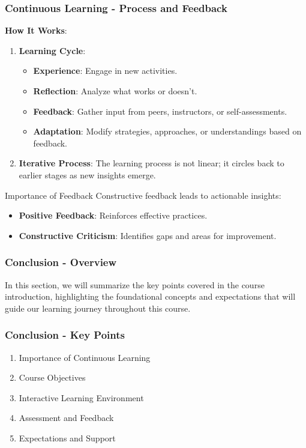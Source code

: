 \documentclass[aspectratio=169]{beamer}
\begin{document}
\begin{frame}[fragile]
    \frametitle{Continuous Learning - Process and Feedback}
    \textbf{How It Works}:
    \begin{enumerate}
        \item \textbf{Learning Cycle}:
            \begin{itemize}
                \item \textbf{Experience}: Engage in new activities.
                \item \textbf{Reflection}: Analyze what works or doesn't.
                \item \textbf{Feedback}: Gather input from peers, instructors, or self-assessments.
                \item \textbf{Adaptation}: Modify strategies, approaches, or understandings based on feedback.
            \end{itemize}
    
        \item \textbf{Iterative Process}: 
            The learning process is not linear; it circles back to earlier stages as new insights emerge.
    \end{enumerate}

    \begin{block}{Importance of Feedback}
        Constructive feedback leads to actionable insights:
        \begin{itemize}
            \item \textbf{Positive Feedback}: Reinforces effective practices. 
            \item \textbf{Constructive Criticism}: Identifies gaps and areas for improvement.
        \end{itemize}
    \end{block}
\end{frame}

\begin{frame}[fragile]
  \frametitle{Conclusion - Overview}
  In this section, we will summarize the key points covered in the course introduction, highlighting the foundational concepts and expectations that will guide our learning journey throughout this course.
\end{frame}

\begin{frame}[fragile]
  \frametitle{Conclusion - Key Points}
  \begin{enumerate}
    \item Importance of Continuous Learning
    \item Course Objectives
    \item Interactive Learning Environment
    \item Assessment and Feedback
    \item Expectations and Support
  \end{enumerate}
\end{frame}
\end{document}

